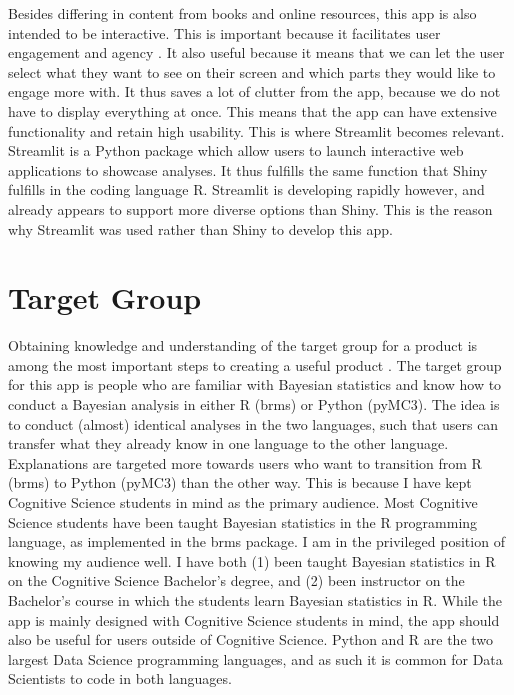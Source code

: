 \documentclass[12pt]{article}
\begin{document}
Besides differing in content from books and online resources, this app is also intended
to be interactive. This is important because it facilitates user engagement and
agency \autocite{janlert2017meaning}.
It also useful because it means that we can let the user select what they want to see on
their screen and which parts they would like to engage more with. It thus saves a lot of
clutter from the app, because we do not have to display everything at once.
This means that the app can have extensive functionality and retain high
usability.
This is where Streamlit becomes relevant. Streamlit is a Python package which allow users
to launch interactive web applications to showcase analyses. It thus fulfills the same function
that Shiny fulfills in the coding language R. Streamlit is developing rapidly however,
and already appears to support more diverse options than Shiny. This is the reason why Streamlit
was used rather than Shiny to develop this app.

\section{Target Group}
Obtaining knowledge and understanding of the target group for a product is among the
most important steps to creating a useful product
\autocite[13]{mills1992macintosh}.
The target group for this app is people who are familiar with Bayesian statistics and know
how to conduct a Bayesian analysis in either R (brms) or Python (pyMC3). The idea is to
conduct (almost) identical analyses in the two languages, such that users can
transfer what they already know in one language to the other language.
Explanations are targeted more towards users who want to transition from R (brms)
to Python (pyMC3) than the other way. This is because I have kept Cognitive Science students
in mind as the primary audience. Most Cognitive Science students have been
taught Bayesian statistics in the R programming language, as implemented in the
brms package. I am in the privileged position of knowing my audience well. I
have both (1) been taught Bayesian statistics in R on the Cognitive Science
Bachelor's degree, and (2) been instructor on the Bachelor's course in which
the students learn Bayesian statistics in R.
While the app is mainly designed with Cognitive Science students in mind,
the app should also be useful for users outside of Cognitive Science.
Python and R are the two largest Data Science programming
languages, and as such it is common for Data Scientists to code in both
languages.
\end{document}

